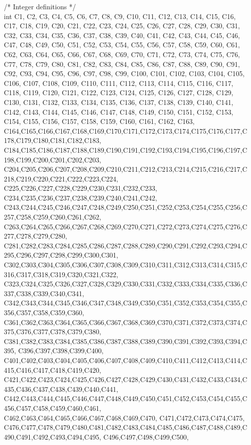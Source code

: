 /* Integer definitions */ \\
int C1, C2, C3, C4, C5, C6, C7, C8, C9, C10, C11, C12, C13, C14, C15, C16, C17, C18, C19, C20, C21, C22, C23, C24, C25, C26, C27, C28, C29, C30, C31, C32, C33, C34, C35, C36, C37, C38, C39, C40, C41, C42, C43, C44, C45, C46, C47, C48, C49, C50, C51, C52, C53, C54, C55, C56, C57, C58, C59, C60, C61, C62, C63, C64, C65, C66, C67, C68, C69, C70, C71, C72, C73, C74, C75, C76, C77, C78, C79, C80, C81, C82, C83, C84, C85, C86, C87, C88, C89, C90, C91, C92, C93, C94, C95, C96, C97, C98, C99, C100, C101, C102, C103, C104, C105, C106, C107, C108, C109, C110, C111, C112, C113, C114, C115, C116, C117, C118, C119, C120, C121, C122, C123, C124, C125, C126, C127, C128, C129, C130, C131, C132, C133, C134, C135, C136, C137, C138, C139, C140, C141, C142, C143, C144, C145, C146, C147, C148, C149, C150, C151, C152, C153, C154, C155, C156, C157, C158, C159, C160, C161, C162, C163,
C164,C165,C166,C167,C168,C169,C170,C171,C172,C173,C174,C175,C176,C177,C178,C179,C180,C181,C182,C183, C184,C185,C186,C187,C188,C189,C190,C191,C192,C193,C194,C195,C196,C197,C198,C199,C200,C201,C202,C203,
C204,C205,C206,C207,C208,C209,C210,C211,C212,C213,C214,C215,C216,C217,C218,C219,C220,C221,C222,C223,C224,
C225,C226,C227,C228,C229,C230,C231,C232,C233, C234,C235,C236,C237,C238,C239,C240,C241,C242,
C243,C244,C245,C246,C247,C248,C249,C250,C251,C252,C253,C254,C255,C256,C257,C258,C259,C260,C261,C262, C263,C264,C265,C266,C267,C268,C269,C270,C271,C272,C273,C274,C275,C276,C277,C278,C279,C280, C281,C282,C283,C284,C285,C286,C287,C288,C289,C290,C291,C292,C293,C294,C295,C296,C297,C298,C299,C300,C301,
C302,C303,C304,C305,C306,C307,C308,C309,C310,C311,C312,C313,C314,C315,C316,C317,C318,C319,C320,C321,C322,
C323,C324,C325,C326,C327,C328,C329,C330,C331,C332,C333,C334,C335,C336,C337,C338,C339,C340,C341,
C342,C343,C344,C345,C346,C347,C348,C349,C350,C351,C352,C353,C354,C355,C356,C357,C358,C359,C360,
C361,C362,C363,C364,C365,C366,C367,C368,C369,C370,C371,C372,C373,C374,C375,C376,C377,C378,C379,C380,
C381,C382,C383,C384,C385,C386,C387,C388,C389,C390,C391,C392,C393,C394,C395, C396,C397,C398,C399,C400,
C401,C402,C403,C404,C405,C406,C407,C408,C409,C410,C411,C412,C413,C414,C415,C416,C417,C418,C419,C420, C421,C422,C423,C424,C425,C426,C427,C428,C429,C430,C431,C432,C433,C434,C435,C436,C437,C438,C439,C440,C441,
C442,C443,C444,C445,C446,C447,C448,C449,C450,C451,C452,C453,C454,C455,C456,C457,C458,C459,C460,C461,
C462,C463,C464,C465,C466,C467,C468,C469,C470, C471,C472,C473,C474,C475,
C476,C477,C478,C479,C480,C481,C482,C483,C484,C485,C486,C487,C488,C489,C490,C491,C492,C493,C494,C495, C496,C497,C498,C499,C500,
